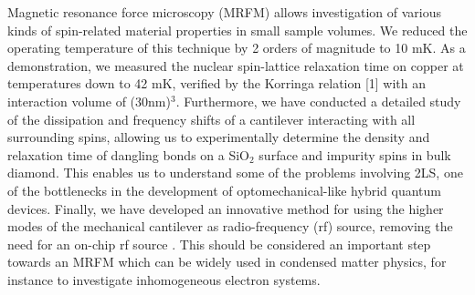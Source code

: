 Magnetic resonance force microscopy (MRFM) allows investigation of various kinds of spin-related material properties in small sample volumes. We reduced the operating temperature of this technique by 2 orders of magnitude to 10 mK. As a  demonstration, we measured the nuclear spin-lattice relaxation time on copper at temperatures down to 42 mK, verified by the Korringa relation [1] with an interaction volume of (30nm)$^3$. 
Furthermore, we have conducted a detailed study of the dissipation and frequency shifts of a cantilever interacting with all surrounding spins, allowing us to experimentally determine the density and relaxation time of dangling bonds on a SiO$_2$ surface \cite{de_Voogd_2017} and impurity spins in bulk diamond. This enables us to understand some of the problems involving 2LS, one of the bottlenecks in the development of optomechanical-like hybrid quantum devices. 
Finally, we have developed an innovative method for using the higher modes of the mechanical cantilever as radio-frequency (rf) source, removing the need for an on-chip rf source \cite{Wagenaar_2017}. This should be considered an important step towards an MRFM which can be widely used in condensed matter physics, for instance to investigate inhomogeneous electron systems.